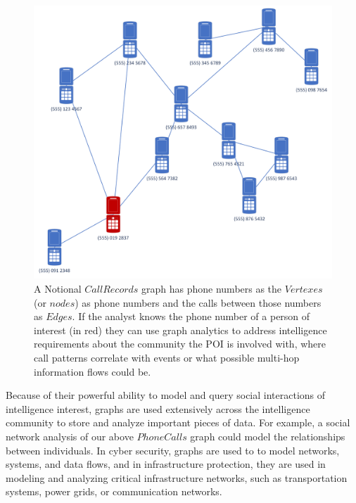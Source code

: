 \documentclass[letterpaper, 10pt]{article}
\begin{document}
\begin{multicols}{2}
        \begin{figure}
            \centering
            \includegraphics[width=\columnwidth]{Papers/ARLIS_MPR_MN/Figures/PhoneRecords.png}
            \caption{A Notional $CallRecords$ graph has phone numbers as the $Vertexes$ (or $nodes$) as phone numbers and the calls between those numbers as $Edges$. If the analyst knows the phone number of a person of interest (in red) they can use graph analytics to address intelligence requirements about the community the POI is involved with, where call patterns correlate with events or what possible multi-hop information flows could be.}
            \label{fig:callRecords}
        \end{figure}
        
        Because of their powerful ability to model and query social interactions of intelligence interest, graphs are used extensively across the intelligence community to store and analyze important pieces of data. For example, a social network analysis of our above $PhoneCalls$ graph could model the relationships between individuals. In cyber security, graphs are used to to model networks, systems, and data flows, and in infrastructure protection, they are used in modeling and analyzing critical infrastructure networks, such as transportation systems, power grids, or communication networks. 


\end{multicols}
\end{document}
